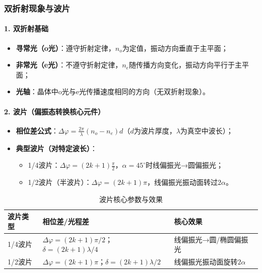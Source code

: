 \subsubsection{双折射现象与波片}
\paragraph{1. 双折射基础}
\begin{itemize}
    \item \textbf{寻常光（o光）}：遵守折射定律，$n_o$为定值，振动方向垂直于主平面；
    \item \textbf{非常光（e光）}：不遵守折射定律，$n_e$随传播方向变化，振动方向平行于主平面；
    \item \textbf{光轴}：晶体中o光与e光传播速度相同的方向（无双折射现象）。
\end{itemize}

\paragraph{2. 波片（偏振态转换核心元件）}
\begin{itemize}
    \item \textbf{相位差公式}：$\Delta\varphi = \frac{2\pi}{\lambda}(n_o - n_e)d$（$d$为波片厚度，$\lambda$为真空中波长）；
    \item \textbf{典型波片（对特定波长）}：
          \begin{itemize}
              \item 1/4波片：$\Delta\varphi = (2k+1)\frac{\pi}{2}$，$\alpha=45^\circ$时线偏振光→圆偏振光；
              \item 1/2波片（半波片）：$\Delta\varphi = (2k+1)\pi$，线偏振光振动面转过$2\alpha$。
          \end{itemize}
\end{itemize}

\begin{table}[htbp]
    \centering
    \scriptsize
    \renewcommand{\arraystretch}{1.2}
    \begin{tabular}{@{}p{2cm}|p{3.5cm}|p{5.5cm}@{}}
        \toprule
        \rowcolor[RGB]{230,240,250} 波片类型 & 相位差/光程差 & 核心效果 \\
        \midrule
        1/4波片 & $\Delta\varphi=(2k+1)\pi/2$；$\delta=(2k+1)\lambda/4$ & 线偏振光→圆/椭圆偏振光 \\
        \midrule
        1/2波片 & $\Delta\varphi=(2k+1)\pi$；$\delta=(2k+1)\lambda/2$ & 线偏振光振动面旋转$2\alpha$ \\
        \bottomrule
    \end{tabular}
    \caption{波片核心参数与效果}
    \label{tab:waveplate}
\end{table}
\vspace{0.5em}

